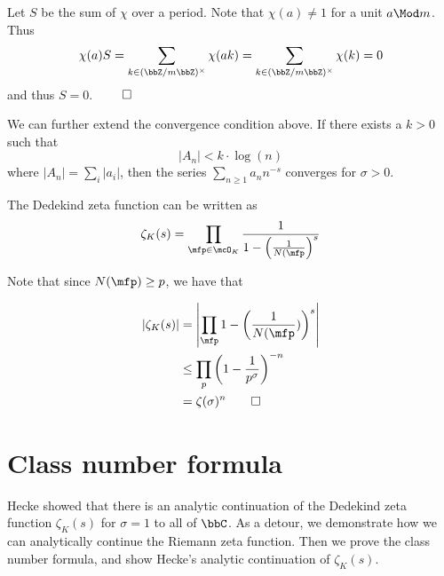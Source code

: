 \documentclass[a4paper, 12pt,oneside,openany]{book}
\begin{document}
Let $S$ be the sum of $\chi$ over a period. Note that $\chi(a) \neq 1$ for a unit $a \Mod m$. Thus $$\chi(a)S = \sum\limits_{k \in (\bbZ/m\bbZ)^\times} \chi(ak)=\sum\limits_{k \in (\bbZ/m\bbZ)^\times} \chi(k)=0$$ and thus $S=0$. $\qed$

We can further extend the convergence condition above. If there exists a $k>0$ such that $$|A_n| < k\cdot \log(n)$$ where $|A_n|=\sum_i |a_i|$, then the series $\sum\limits_{n\geq 1} a_nn^{-s}$ converges for $\sigma >0$.




The Dedekind zeta function can be written as $$\zeta_K(s)=\prod\limits_{\mfp \in \mcO_K} \frac{1}{1-\left(\frac{1}{N(\mfp}\right)^s}$$ 


 Note that since $N(\mfp)\geq p$, we have that

\begin{align*}
	|\zeta_K(s)| &= \left| \prod\limits_\mfp 1-\left(\frac{1}{N(\mfp})\right)^s \right| \\
	&\leq \prod\limits_p \left(1-\frac{1}{p^\sigma} \right)^{-n} \\
	&= \zeta(\sigma)^n \qed
\end{align*}

\section{Class number formula}

Hecke showed that there is an analytic continuation of the Dedekind zeta function $\zeta_K(s)$ for $\sigma=1$ to all of $\bbC$. As a detour, we demonstrate how we can analytically continue the Riemann zeta function. Then we prove the class number formula, and show Hecke's analytic continuation of $\zeta_K(s)$.
\end{document}
